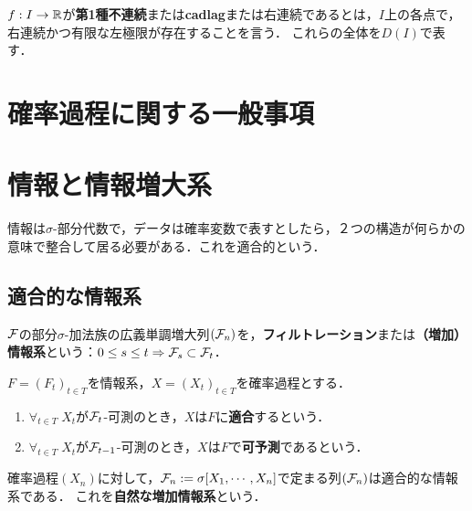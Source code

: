 \documentclass[uplatex,dvipdfmx]{jsreport}
\begin{document}
\begin{definition}
    $f:I\to\mathbb{R}$が\textbf{第1種不連続}または\textbf{cadlag}または右連続であるとは，$I$上の各点で，右連続かつ有限な左極限が存在することを言う．
    これらの全体を$D(I)$で表す．
\end{definition}

\section{確率過程に関する一般事項}

\section{情報と情報増大系}

\begin{tcolorbox}[colframe=ForestGreen, colback=ForestGreen!10!white,breakable,colbacktitle=ForestGreen!40!white,coltitle=black,fonttitle=\bfseries\sffamily,
title=]
    情報は$\sigma$-部分代数で，データは確率変数で表すとしたら，２つの構造が何らかの意味で整合して居る必要がある．これを適合的という．
\end{tcolorbox}

\subsection{適合的な情報系}

\begin{definition}
    $\mathcal{F}$の部分$\sigma$-加法族の広義単調増大列$(\mathcal{F}_n)$を，\textbf{フィルトレーション}または\textbf{（増加）情報系}という：$0\le s\le t\Rightarrow \mathcal{F}_s\subset\mathcal{F}_t$．
\end{definition}

\begin{definition}
    $F=(F_t)_{t\in T}$を情報系，$X=(X_t)_{t\in T}$を確率過程とする．
    \begin{enumerate}
        \item $\forall_{t\in T}\;X_t$が$\mathcal{F}_t$-可測のとき，$X$は$F$に\textbf{適合}するという．
        \item $\forall_{t\in T}\;X_t$が$\mathcal{F}_{t-1}$-可測のとき，$X$は$F$で\textbf{可予測}であるという．
    \end{enumerate}
\end{definition}

\begin{example}
    確率過程$(X_n)$に対して，$\mathcal{F}_n:=\sigma[X_1,\cdots,X_n]$で定まる列$(\mathcal{F}_n)$は適合的な情報系である．
    これを\textbf{自然な増加情報系}という．
\end{example}
\end{document}
